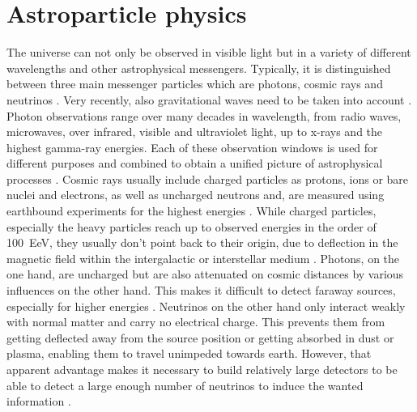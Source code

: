 \chapter{Astroparticle physics}
  \label{chap:astro}

The universe can not only be observed in visible light but in a variety of different wavelengths and other astrophysical messengers.
Typically, it is distinguished between three main messenger particles which are photons, cosmic rays and neutrinos .
Very recently, also gravitational waves need to be taken into account .
Photon observations range over many decades in wavelength, from radio waves, microwaves, over infrared, visible and ultraviolet light, up to x-rays and the highest gamma-ray energies.
Each of these observation windows is used for different purposes and combined to obtain a unified picture of astrophysical processes .
Cosmic rays usually include charged particles as protons, ions or bare nuclei and electrons, as well as uncharged neutrons and,  are measured using earthbound experiments for the highest energies .
While charged particles, especially the heavy particles reach up to observed energies in the order of \SI{100}{\exa\eV}, they usually don't point back to their origin, due to deflection in the magnetic field within the intergalactic or interstellar medium .
Photons, on the one hand, are uncharged but are also attenuated on cosmic distances by various influences on the other hand.
This makes it difficult to detect faraway sources, especially for higher energies .
Neutrinos on the other hand only interact weakly with normal matter and carry no electrical charge.
This prevents them from getting deflected away from the source position or getting absorbed in dust or plasma, enabling them to travel unimpeded towards earth.
However, that apparent advantage makes it necessary to build relatively large detectors to be able to detect a large enough number of neutrinos to induce the wanted information .

